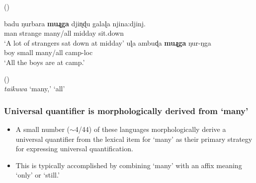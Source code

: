 \documentclass{article}
\begin{document}
\begin{exe}
 (\citealt[56,65]{platt72}) 
\begin{xlist}
\ex \gll badu ŋurbara \textbf{muɻga} {djiɳɖu galaɭa} njina:djinj. \\ 
    man  strange  many/all  midday         sit.down\\
\glt `A lot of strangers sat down at midday'
\ex \gll uɭa ambuɖa \textbf{muɻga} ŋur-ŋga  \\
    boy   small    many/all      camp-{\sc loc}\\
\glt        `All the boys are at camp.'%
\end{xlist}
 (\citealt[85,107]{osborne74})\\
{\it taikuwa} `many,' `all'

\end{exe}


\subsubsection{Universal quantifier is morphologically derived from `many'}

\begin{itemize}
    \item A small number ($\sim$4/44) of these languages morphologically derive a universal quantifier from the lexical item for `many' as their primary strategy for expressing universal quantification.
    \item This is typically accomplished by combining `many' with an affix meaning `only' or `still.'
\end{itemize}
\end{document}
